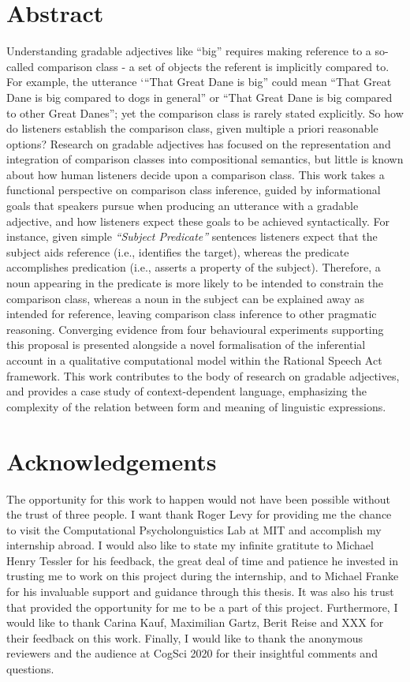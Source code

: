 \documentclass[12pt]{report}
\begin{document}


\chapter*{Abstract}
Understanding gradable adjectives like “big” requires making reference to a so-called comparison class - a set of objects the referent is implicitly compared to. For example, the utterance ‘“That Great Dane is big” could mean “That Great Dane is big compared to dogs in general” or “That Great Dane is big compared to other Great Danes”; yet the comparison class is rarely stated explicitly. So how do listeners establish the comparison class, given multiple a priori reasonable options?
Research on gradable adjectives has focused on the representation and integration of comparison classes into compositional semantics, but little is known about how human listeners decide upon a comparison class. 
This work takes a functional perspective on comparison class inference, guided by informational goals that speakers pursue when producing an utterance with a gradable adjective, and how listeners expect these goals to be achieved syntactically. For instance, given simple \textit{“Subject Predicate”} sentences listeners expect that the subject aids reference (i.e., identifies the target), whereas the predicate accomplishes predication (i.e., asserts a property of the subject). Therefore, a noun appearing in the predicate is more likely to be intended to constrain the comparison class, whereas a noun in the subject can be explained away as intended for reference, leaving comparison class inference to other pragmatic reasoning. 
Converging evidence from four behavioural experiments supporting this proposal is presented alongside a novel formalisation of the inferential account in a qualitative computational model within the Rational Speech Act framework. This work contributes to the body of research on gradable adjectives, and provides a case study of  context-dependent language, emphasizing the complexity of the relation between form and meaning of linguistic expressions. 


\chapter*{Acknowledgements}

The opportunity for this work to happen would not have been possible without the trust of three people. I want thank Roger Levy for providing me the chance to visit the Computational Psycholonguistics Lab at MIT and accomplish my internship abroad. I would also like to state my infinite gratitute to Michael Henry Tessler for his feedback, the great deal of time and patience he invested in trusting me to work on this project during the internship, and to Michael Franke for his invaluable support and guidance through this thesis. It was also his trust that provided the opportunity for me to be a part of this project. Furthermore, I would like to thank Carina Kauf, Maximilian Gartz, Berit Reise and XXX for their feedback on this work. Finally, I would like to thank the anonymous reviewers and the audience at CogSci 2020 for their insightful comments and questions.
\end{document}
